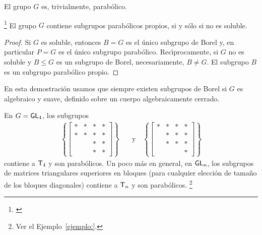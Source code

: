 El grupo $G$ es, trivialmente, parab\'{o}lico.

\begin{propoParabolicosPropios}\label{propo:variedades:parabolicospropios}
	\footnote{
		\cite[Corollary~17.17]{MilneAlgebraicGroups}
	}
	El grupo $G$ contiene subgrupos parab\'{o}licos propios, si y s\'{o}lo
	si no es soluble.
\end{propoParabolicosPropios}

\begin{proof}
	Si $G$ es soluble, entonces $B=G$ es el \'{u}nico subgrupo de Borel y,
	en particular $P=G$ es el \'{u}nico subgrupo parab\'{o}lico.
	Rec\'{\i}procamente, si $G$ no es soluble y $B\leq G$ es un subgrupo de
	Borel, necesariamente, $B\not =G$. El subgrupo $B$ es un subgrupo
	parab\'{o}lico propio.
\end{proof}

\begin{obsParabolicosPropios}
	En esta demostraci\'{o}n usamos que siempre existen subgrupos de Borel
	si $G$ es algebraico y suave, definido sobre un cuerpo algebraicamente
	cerrado.
\end{obsParabolicosPropios}

\begin{ejemploTriangulares}\label{ejemplo:triangulares:parabolicos}
	En $G=\GL[4]$, los subgrupos
	\begin{align*}
		\left\{ \begin{bmatrix}
				* & * & * & * \\
				* & * & * & * \\
				& & * & * \\
				& & * & *
			\end{bmatrix} \right\}
		& \quad\text{y}\quad
		\left\{ \begin{bmatrix}
				* & * & * & * \\
				& * & * & * \\
				& * & * & * \\
				& & & *
			\end{bmatrix} \right\}
	\end{align*}
	contiene a $\triangulares[4]$ y son parab\'{o}licos. Un poco m\'{a}s en
	general, en $\GL[n]$, los subgrupos de matrices triangulares superiores
	en bloques (para cualquier elecci\'{o}n de tama\~{n}o de los bloques
	diagonales) contiene a $\triangulares[n]$ y son parab\'{o}licos.%
	\footnote{
		Ver el Ejemplo~\ref{ejemplo:}.
	}
\end{ejemploTriangulares}

